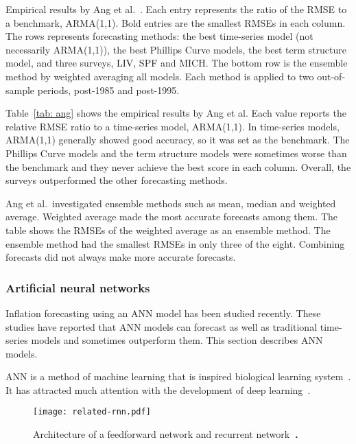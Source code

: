 \documentclass[../main.tex]{subfiles}
\begin{document}
\begin{table}
  \caption{
    Empirical results by Ang et al.~\cite{Ang2007}.
    Each entry represents the ratio of the RMSE to a benchmark, ARMA(1,1).
    Bold entries are the smallest RMSEs in each column.
    The rows represents forecasting methods: the best time-series model (not necessarily ARMA(1,1)), the best Phillips Curve models, the best term structure model, and three surveys, LIV, SPF and MICH\@.  The bottom row is the ensemble method by weighted averaging all models.
    Each method is applied to two out-of-sample periods, post-1985 and post-1995.
  }\label{tab: ang}
  \begin{center}
    
  \end{center}
\end{table}

Table~\ref{tab: ang} shows the empirical results by Ang et al.
Each value reports the relative RMSE ratio to a time-series model, ARMA(1,1).
In time-series models, ARMA(1,1) generally showed good accuracy, so it was set as the benchmark.
The Phillips Curve models and the term structure models were sometimes worse than the benchmark and they never achieve the best score in each column.
Overall, the surveys outperformed the other forecasting methods.

Ang et al.\ investigated ensemble methods such as mean, median and weighted average.
Weighted average made the most accurate forecasts among them.  The table shows the RMSEs of the weighted average as an ensemble method.
The ensemble method had the smallest RMSEs in only three of the eight.  Combining forecasts did not always make more accurate forecasts.

\subsubsection{Artificial neural networks}

Inflation forecasting using an ANN model has been studied recently\cite{Choudhary2012, Moshiri2000, Nakamura2005}.
These studies have reported that ANN models can forecast as well as traditional time-series models and sometimes outperform them.
This section describes ANN models.

ANN is a method of machine learning that is inspired biological learning system~\cite{Mitchell1997}.  It has attracted much attention with the development of deep learning~\cite{岡谷2015}.

\begin{figure}
  \centering
  \texttt{[image: related-rnn.pdf]}
  \caption{
    Architecture of a feedforward network and recurrent network~\cite{Mitchell1997}．
  }\label{fig: RNN}
\end{figure}
\end{document}
